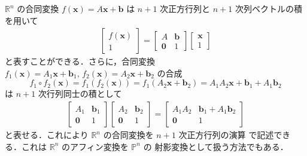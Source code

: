 \documentclass[11pt, uplatex, dvipdfmx, titlepage]{jsarticle}
\DeclareMathOperator{\Isom}{Isom}
\DeclareMathOperator{\Aff}{Aff}
\theoremstyle{definition}
\begin{document}
$\mathbb{R}^n$ の合同変換 $f(\bm{x}) = A\bm{x} + \bm{b}$ は $n+1$ 次正方行列と $n+1$ 次列ベクトルの積を用いて
\begin{align*}
  \left[
  \begin{array}{c}
    f(\bm{x})\\
    1
  \end{array}
  \right] = \left[
  \begin{array}{cc}
    A & \bm{b}\\
    \bm{0} & 1
  \end{array}
             \right] \left[
             \begin{array}{c}
               \bm{x}\\
               1
             \end{array}
  \right]
\end{align*}
と表すことができる．さらに，合同変換
$f_1(\bm{x})=A_1 \bm{x} + \bm{b}_1, \, f_2(\bm{x}) = A_2\bm{x} +
\bm{b}_2$ の合成
\[
  f_1\circ f_2(\bm{x}) =  f_1\left( f_2\left( \bm{x}\right) \right) 
  = f_1\left( A_2 \bm{x}+\bm{b}_2\right) = A_1 A_2 \bm{x} + \bm{b}_1+A_1\bm{b}_2
\]
は $n+1$ 次行列同士の積として
\begin{align*}
  \left[
  \begin{array}{cc}
    A_1 & \bm{b}_1\\
    \bm{0} & 1
  \end{array}
             \right] \left[
             \begin{array}{cc}
               A_2 & \bm{b}_2\\
               \bm{0} & 1
             \end{array}
                        \right] = \left[
                        \begin{array}{cc}
                          A_1 A_2 & \bm{b}_1+A_1\bm{b}_2\\
                          \bm{0} & 1
                        \end{array}
                                   \right]
\end{align*}
と表せる．これにより $\mathbb{R}^n$ の合同変換を $n+1$ 次正方行列の演算
で記述できる．これは $\mathbb{R}^n$ のアフィン変換を $\mathbb{P}^n$ の
射影変換として扱う方法でもある．


\end{document}
